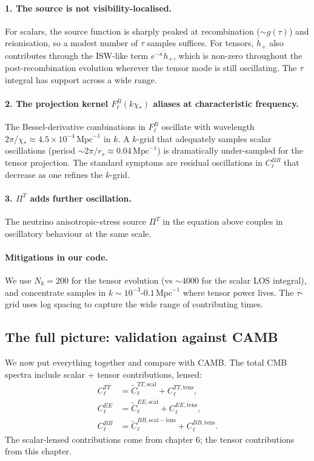 \paragraph{1. The source is not visibility-localised.}
For scalars, the source function is sharply peaked at recombination ($\sim g(\tau)$) and reionisation, so a modest number of $\tau$ samples suffices. For tensors, $\dot h_+$ also contributes through the ISW-like term $e^{-\kappa}\dot h_+$, which is non-zero throughout the post-recombination evolution wherever the tensor mode is still oscillating. The $\tau$ integral has support across a wide range.

\paragraph{2. The projection kernel $F^B_\ell(k\chi_*)$ aliases at characteristic frequency.}
The Bessel-derivative combinations in $F^B_\ell$ oscillate with wavelength $2\pi/\chi_* \approx 4.5 \times 10^{-4}\,\mathrm{Mpc}^{-1}$ in $k$. A $k$-grid that adequately samples scalar oscillations (period $\sim 2\pi/r_s \approx 0.04\,\mathrm{Mpc}^{-1}$) is dramatically under-sampled for the tensor projection. The standard symptoms are residual oscillations in $C_\ell^{BB}$ that decrease as one refines the $k$-grid.

\paragraph{3. $\Pi^T$ adds further oscillation.}
The neutrino anisotropic-stress source $\Pi^T$ in the equation above couples in oscillatory behaviour at the same scale.

\paragraph{Mitigations in our code.}
We use $N_k = 200$ for the tensor evolution (vs $\sim 4000$ for the scalar LOS integral), and concentrate samples in $k\sim 10^{-3}$-$0.1\,\mathrm{Mpc}^{-1}$ where tensor power lives. The $\tau$-grid uses log spacing to capture the wide range of contributing times.

\subsection{The full picture: validation against CAMB}

We now put everything together and compare with CAMB. The total CMB spectra include scalar + tensor contributions, lensed:
\begin{align*}
  C_\ell^{TT}    &= \tilde C_\ell^{TT,\mathrm{scal}} + C_\ell^{TT,\mathrm{tens}}, \\
  C_\ell^{EE}    &= \tilde C_\ell^{EE,\mathrm{scal}} + C_\ell^{EE,\mathrm{tens}}, \\
  C_\ell^{BB}    &= \tilde C_\ell^{BB,\mathrm{scal-lens}} + C_\ell^{BB,\mathrm{tens}}.
\end{align*}
The scalar-lensed contributions come from chapter 6; the tensor contributions from this chapter.

